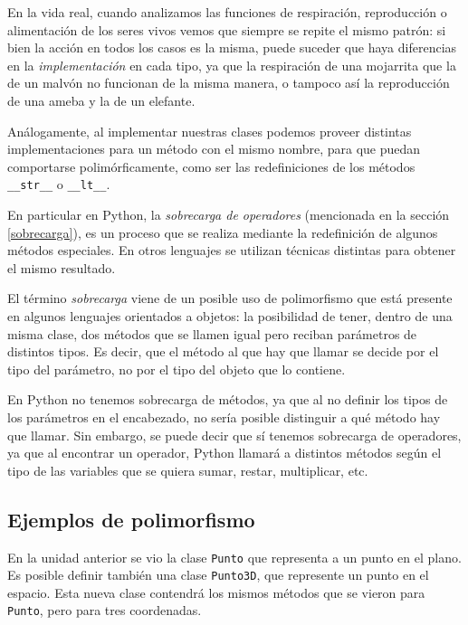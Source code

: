 En la vida real, cuando analizamos las funciones de respiración,
reproducción o alimentación de los seres vivos vemos que siempre se repite
el mismo patrón: si bien la acción en todos los casos es la misma, puede
suceder que haya diferencias en la {\it implementación} en cada tipo, ya
que la respiración de una mojarrita que la de un malvón no funcionan de la
misma manera, o tampoco así la reproducción de una ameba y la de un elefante.

Análogamente, al implementar nuestras clases podemos proveer
distintas implementaciones para un método con el mismo nombre, para que
puedan comportarse polimórficamente, como ser las redefiniciones de los
métodos \lstinline!__str__! o \lstinline!__lt__!.

En particular en Python, la {\it sobrecarga de operadores} (mencionada
en la sección \ref{sobrecarga}),  es un proceso que se realiza mediante la
redefinición de
algunos métodos especiales.  En otros lenguajes se utilizan técnicas distintas
para obtener el mismo resultado.

\begin{sabias_que}
El término {\it sobrecarga} viene de un posible uso de polimorfismo que
está presente en algunos lenguajes orientados a objetos: la posibilidad de
tener, dentro de una misma clase, dos métodos que se llamen igual pero
reciban parámetros de distintos tipos.  Es decir, que el método al que hay
que llamar se decide por el tipo del parámetro, no por el tipo del objeto
que lo contiene.

En Python no tenemos sobrecarga de métodos, ya que al no definir los tipos
de los parámetros en el encabezado, no sería posible distinguir a qué
método hay que llamar.  Sin embargo, se puede decir que sí tenemos
sobrecarga de operadores, ya que al encontrar un operador, Python llamará a
distintos métodos según el tipo de las variables que se quiera sumar,
restar, multiplicar, etc.
\end{sabias_que}

\subsection*{Ejemplos de polimorfismo}

En la unidad anterior se vio la clase \lstinline!Punto! que representa a un
punto en el plano.  Es posible definir también una clase
\lstinline!Punto3D!, que represente un punto en el espacio.  Esta nueva
clase contendrá los mismos métodos que se vieron para \lstinline!Punto!,
pero para tres coordenadas.

